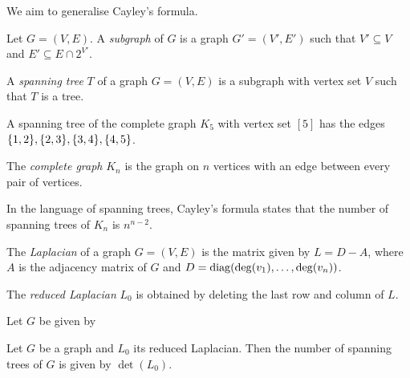 We aim to generalise Cayley's formula.
\begin{definition}[Subgraph] \label{def:graph:subgraph}
    Let $G = (V, E)$.
    A \emph{subgraph} of $G$ is a graph $G' = (V', E')$ such that
    $V' \subseteq V$ and $E' \subseteq E \cap 2^{V'}$.
\end{definition}

\begin{definition} \label{def:graph:spanning_tree}
    A \emph{spanning tree} $T$ of a graph $G = (V, E)$ is a subgraph with
    vertex set $V$ such that $T$ is a tree.
\end{definition}
\begin{example}
    A spanning tree of the complete graph $K_5$ with vertex set $[5]$ has
    the edges $\set{1, 2}, \set{2, 3}, \set{3, 4}, \set{4, 5}$.
\end{example}

\begin{definition} \label{def:graph:complete}
    The \emph{complete graph} $K_n$ is the graph on $n$ vertices with
    an edge between every pair of vertices.
\end{definition}
In the language of spanning trees, Cayley's formula states that the number
of spanning trees of $K_n$ is $n^{n-2}$.

\begin{definition*}[Laplacian] \label{def:graph:laplacian}
    The \emph{Laplacian} of a graph $G = (V, E)$ is the matrix given by
    $L = D - A$, where $A$ is the adjacency matrix of $G$ and
    $D = \operatorname{diag}(\operatorname{deg}(v_1), \dots, \operatorname{deg}(v_n))$.

    The \emph{reduced Laplacian} $L_0$ is obtained by deleting the last row
    and column of $L$.
\end{definition*}

\begin{example}
    Let $G$ be given by
    \begin{center}
    \end{center}
\end{example}

\begin{theorem*} \label{thm:graph:kirchoff}
    Let $G$ be a graph and $L_0$ its reduced Laplacian.
    Then the number of spanning trees of $G$ is given by $\det(L_0)$.
\end{theorem*}

